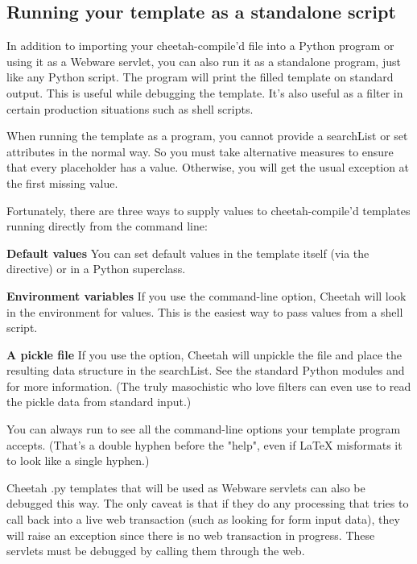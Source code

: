 \subsection{Running your template as a standalone script}
\label{howWorks.standalone}

In addition to importing your cheetah-compile'd  file into a Python
program or using it as a Webware servlet, you can also run it as a standalone
program, just like any Python script.  The program will print the filled
template on standard output.  This is useful while debugging the template.
It's also useful as a filter in certain production situations such as shell
scripts.  

When running the template as a program, you cannot provide a searchList or
set  attributes in the normal way.  So you must take
alternative measures to ensure that every placeholder has a value.
Otherwise, you will get the usual  exception at
the first missing value.

Fortunately, there are three ways to supply values to cheetah-compile'd
templates running directly from the command line:

\begin{description}
\item{{\bf Default values}}  You can set default values in the template itself
     (via the  directive) or in a Python superclass.
\item{{\bf Environment variables}} If you use the  command-line option,
     Cheetah will look in the environment for values.  This is the easiest way
     to pass values from a shell script.
\item{{\bf A pickle file}}  If you use the  option, 
     Cheetah will unpickle the file and place the resulting data structure in
     the searchList.    See the standard Python modules  and
      for more information.  (The truly masochistic who love
     filters can even use  to read the pickle data from standard
     input.)
\end{description}

You can always run  to see all the command-line
options your template program accepts.  (That's a double hyphen before the
"help", even if LaTeX misformats it to look like a single hyphen.)

Cheetah .py templates that will be used as Webware servlets can also be 
debugged this way.  The only caveat is that if they do any processing that
tries to call back into a live web transaction (such as looking for form
input data), they will raise an exception since there is no web transaction
in progress.  These servlets must be debugged by calling them through the
web.


